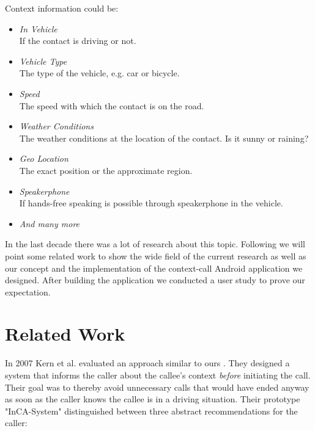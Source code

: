 \documentclass{sigchi}
\begin{document}
Context information could be:
\begin{itemize}
	\item \textit{In Vehicle}\\
	If the contact is driving or not.
	\item \textit{Vehicle Type}\\
	The type of the vehicle, e.g. car or bicycle.
	\item \textit{Speed}\\
	The speed with which the contact is on the road.
	\item \textit{Weather Conditions}\\
	The weather conditions at the location of the contact. Is it sunny or raining?
	\item \textit{Geo Location}\\
	The exact position or the approximate region.
	\item \textit{Speakerphone}\\
	If hands-free speaking is possible through speakerphone in the vehicle.
	\item \textit{And many more}
\end{itemize}

In the last decade there was a lot of research about this topic. Following we will point some related work to show the wide field of the current research as well as our concept and the implementation of the context-call Android application we designed. After building the application we conducted a user study to prove our expectation.


\section{Related Work}

 In 2007 Kern et al. evaluated an approach similar to ours \cite{kern07}. They designed a system that informs the caller about the callee's context \textit{before} initiating the call. Their goal was to thereby avoid unnecessary calls that would have ended anyway as soon as the caller knows the callee is in a driving situation. Their prototype "InCA-System" distinguished between three abstract recommendations for the caller:
 
\end{document}
